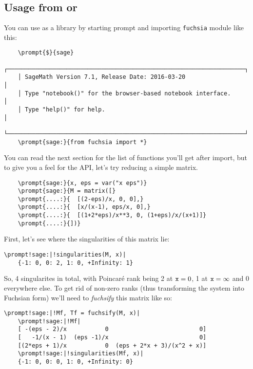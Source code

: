 \documentclass[12pt,a4paper]{article}
\begin{document}
\subsection{Usage from \sage or \python}
\label{sec:usage_py}

You can use \fuchsia as a library by starting \sage prompt and importing \texttt{fuchsia} module like this:

\begin{Verbatim}
    \prompt{$}{sage}
    ┌────────────────────────────────────────────────────────────────────┐
    │ SageMath Version 7.1, Release Date: 2016-03-20                     │
    │ Type "notebook()" for the browser-based notebook interface.        │
    │ Type "help()" for help.                                            │
    └────────────────────────────────────────────────────────────────────┘
    \prompt{sage:}{from fuchsia import *}
\end{Verbatim}

You can read the next section for the list of functions you'll get after import, but to give you a feel for the API, let's try reducing a simple matrix.

\begin{Verbatim}
    \prompt{sage:}{x, eps = var("x eps")}
    \prompt{sage:}{M = matrix([}
    \prompt{....:}{  [(2-eps)/x, 0, 0],}
    \prompt{....:}{  [x/(x-1), eps/x, 0],}
    \prompt{....:}{  [(1+2*eps)/x**3, 0, (1+eps)/x/(x+1)]}
    \prompt{....:}{])}
\end{Verbatim}

First, let's see where the singularities of this matrix lie:

\begin{Verbatim}[commandchars=\\!|]
    \prompt!sage:|!singularities(M, x)|
    {-1: 0, 0: 2, 1: 0, +Infinity: 1}
\end{Verbatim}

So, 4 singularites in total, with Poincar\'e rank being 2 at $\texttt{x}=0$, 1 at $\texttt{x}=\infty$ and 0 everywhere else.
To get rid of non-zero ranks (thus transforming the system into Fuchsian form) we'll need to \textit{fuchsify} this matrix like so:

\begin{Verbatim}[commandchars=\\!|]
    \prompt!sage:|!Mf, Tf = fuchsify(M, x)|
    \prompt!sage:|!Mf|
    [ -(eps - 2)/x           0                          0]
    [   -1/(x - 1)  (eps -1)/x                          0]
    [(2*eps + 1)/x           0  (eps + 2*x + 3)/(x^2 + x)]
    \prompt!sage:|!singularities(Mf, x)|
    {-1: 0, 0: 0, 1: 0, +Infinity: 0}
\end{Verbatim}
\end{document}

